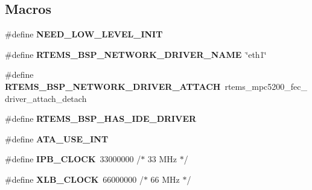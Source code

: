\subsection*{Macros}
\begin{DoxyCompactItemize}
\item 
\mbox{\label{group__RTEMSBSPsPowerPCGen5200_gaddeb3f5e51cf41928653d826fa541063}} 
\#define {\bfseries N\+E\+E\+D\+\_\+\+L\+O\+W\+\_\+\+L\+E\+V\+E\+L\+\_\+\+I\+N\+IT}
\item 
\mbox{\label{group__RTEMSBSPsPowerPCGen5200_ga86d4f9aa98431100692e31068070a8df}} 
\#define {\bfseries R\+T\+E\+M\+S\+\_\+\+B\+S\+P\+\_\+\+N\+E\+T\+W\+O\+R\+K\+\_\+\+D\+R\+I\+V\+E\+R\+\_\+\+N\+A\+ME}~\char`\"{}eth1\char`\"{}
\item 
\mbox{\label{group__RTEMSBSPsPowerPCGen5200_gadde0d66aef9442971dde465292ac14e6}} 
\#define {\bfseries R\+T\+E\+M\+S\+\_\+\+B\+S\+P\+\_\+\+N\+E\+T\+W\+O\+R\+K\+\_\+\+D\+R\+I\+V\+E\+R\+\_\+\+A\+T\+T\+A\+CH}~rtems\+\_\+mpc5200\+\_\+fec\+\_\+driver\+\_\+attach\+\_\+detach
\item 
\mbox{\label{group__RTEMSBSPsPowerPCGen5200_ga87abeaa01ac0eb5bf8fb5f78e7c16f28}} 
\#define {\bfseries R\+T\+E\+M\+S\+\_\+\+B\+S\+P\+\_\+\+H\+A\+S\+\_\+\+I\+D\+E\+\_\+\+D\+R\+I\+V\+ER}
\item 
\mbox{\label{group__RTEMSBSPsPowerPCGen5200_gabd42079022d4b384c2136ee591535ed5}} 
\#define {\bfseries A\+T\+A\+\_\+\+U\+S\+E\+\_\+\+I\+NT}
\item 
\mbox{\label{group__RTEMSBSPsPowerPCGen5200_ga693b0c0bc75323df092a5815d1ed9cb8}} 
\#define {\bfseries I\+P\+B\+\_\+\+C\+L\+O\+CK}~33000000   /$\ast$ 33 M\+Hz $\ast$/
\item 
\mbox{\label{group__RTEMSBSPsPowerPCGen5200_gae0b4062061fda301c354cbcf61b056ad}} 
\#define {\bfseries X\+L\+B\+\_\+\+C\+L\+O\+CK}~66000000   /$\ast$ 66 M\+Hz $\ast$/
\item 
\mbox{\label{group__RTEMSBSPsPowerPCGen5200_gac2e9ac15473bdfecd1b0ee6ac43b3f36}} 

\end{DoxyCompactItemize}
